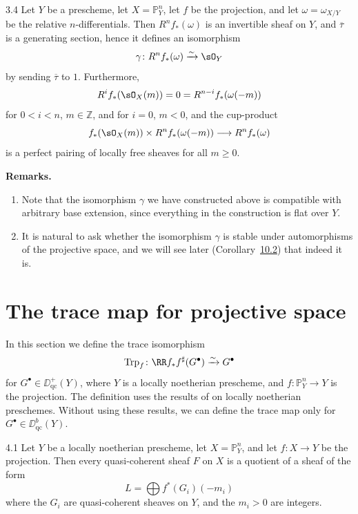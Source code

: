 \begin{booktheorem}{3.4}\label{thm:3.3.4}
\cite[\nopp III,~2.1.12]{EGA} Let $Y$ be a prescheme, let $X=\mathbb{P}^n_Y$, let $f$ be the projection, and let $\omega=\omega_{X/Y}$ be the relative $n$-differentials. Then $R^n f_*(\omega)$ is an invertible sheaf on $Y$, and $\overline{\tau}$ is a generating section, hence it defines an isomorphism
\[
\gamma\colon R^n f_*(\omega) \xrightarrow{\sim} \sO_Y
\]
by sending $\overline{\tau}$ to $1$. Furthermore,
\[
R^i f_*(\sO_X(m)) = 0 = R^{n-i}f_*(\omega(-m))
\]
for $0<i<n$, $m\in\mathbb{Z}$, and for $i=0$, $m<0$, and the cup-product
\[
f_*(\sO_X(m)) \times R^n f_*(\omega(-m)) \longrightarrow R^n f_*(\omega)
\]
is a perfect pairing of locally free sheaves for all $m\ge 0$.
\end{booktheorem}

\textbf{Remarks.}
\begin{enumerate}
\item Note that the isomorphism $\gamma$ we have constructed above is compatible with arbitrary base extension, since everything in the construction is flat over $Y$.
\item It is natural to ask whether the isomorphism $\gamma$ is stable under automorphisms of the projective space, and we will see later (Corollary~\hyperref[cor:3.10.2]{10.2}) that indeed it is.
\end{enumerate}
\section{The trace map for projective space}\label{sec:3.4}

In this section we define the trace isomorphism
\[
\operatorname{Trp}_f \colon \RR f_* f^{\sharp}(G^\bullet) \xrightarrow{\sim} G^\bullet
\]
for $G^\bullet\in\DD_{\mathrm{qc}}^+(Y)$, where $Y$ is a locally noetherian prescheme, and $f\colon\mathbb{P}^n_Y\to Y$ is the projection. The definition uses the results of  on locally noetherian preschemes. Without using these results, we can define the trace map only for $G^\bullet\in\DD_{\mathrm{qc}}^b(Y)$.

\begin{booklemma}{4.1}\label{lem:3.4.1}
Let $Y$ be a locally noetherian prescheme, let $X=\mathbb{P}_Y^n$, and let $f\colon X\to Y$ be the projection. Then every quasi-coherent sheaf $F$ on $X$ is a quotient of a sheaf of the form
\[
L = \bigoplus f^*(G_i)(-m_i)
\]
where the $G_i$ are quasi-coherent sheaves on $Y$, and the $m_i>0$ are integers.
\end{booklemma}

